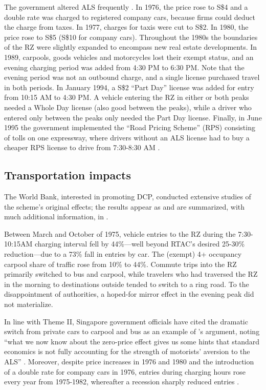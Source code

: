 The government altered ALS frequently \citep{PhangToh1997}. In 1976, the price rose to S\$4 and a double rate was charged to registered company cars, because firms could deduct the charge from taxes. In 1977, charges for taxis were cut to S\$2. In 1980, the price rose to S\$5 (S\$10 for company cars). Throughout the 1980s the boundaries of the RZ were slightly expanded to encompass new real estate developments. In 1989, carpools, goods vehicles and motorcycles lost their exempt status, and an evening charging period was added from 4:30 PM to 6:30 PM. Note that the evening period was not an outbound charge, and a single license purchased travel in both periods. In January 1994, a S\$2 ``Part Day'' license was added for entry from 10:15 AM to 4:30 PM. A vehicle entering the RZ in either or both peaks needed a Whole Day license (also good between the peaks), while a driver who entered only between the peaks only needed the Part Day license. Finally, in June 1995 the government implemented the ``Road Pricing Scheme'' (RPS) consisting of tolls on one expressway, where drivers without an ALS license had to buy a cheaper RPS license to drive from 7:30-8:30 AM \citep[p. 20]{PhangToh2004}. 

\subsection{Transportation impacts}

The World Bank, interested in promoting DCP, conducted extensive studies of the scheme's original effects; the results appear as \citet{WatsonHolland1978} and are summarized, with much additional information, in \citet[Ch. 3]{Gomez-Ibanez1994}. 

Between March and October of 1975, vehicle entries to the RZ during the 7:30-10:15AM charging interval fell by 44\%---well beyond RTAC's desired 25-30\% reduction---due to a 73\% fall in entries by car. The (exempt) 4+ occupancy carpool share of traffic rose from 10\% to 44\%. Commute trips into the RZ primarily switched to bus and carpool, while travelers who had traversed the RZ in the morning to destinations outside tended to switch to a ring road. To the disappointment of authorities, a hoped-for mirror effect in the evening peak did not materialize.

In line with Theme II, Singapore government officials have cited the dramatic switch from private cars to carpool and bus as an example of \citet{Shampanier2007}'s argument, noting ``what we now know about the zero-price effect gives us some hints that standard economics is not fully accounting for the strength of motorists’ aversion to the ALS'' \citep[p.17]{Lew2009}. Moreover, despite price increases in 1976 and 1980 and the introduction of a double rate for company cars in 1976, entries during charging hours rose every year from 1975-1982, whereafter a recession sharply reduced entries \citep[pp. 17-18, Tab. 7]{Gomez-Ibanez1994}. 


